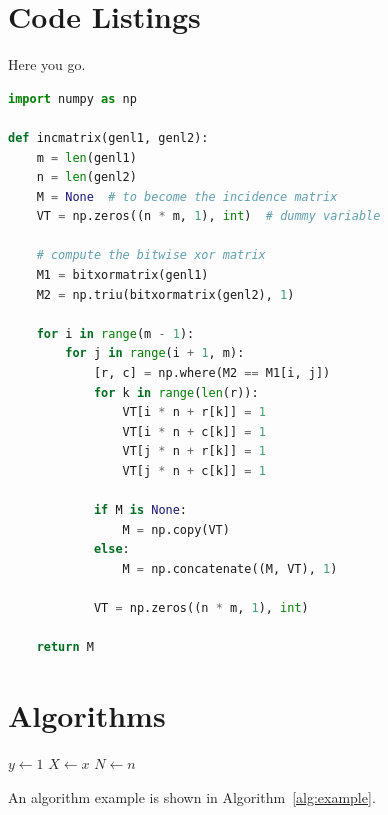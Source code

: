 \blindtext

\section{Code Listings}

Here you go.

\begin{lstlisting}[language=Python,caption={My Listing Caption},captionpos=b]
import numpy as np

def incmatrix(genl1, genl2):
    m = len(genl1)
    n = len(genl2)
    M = None  # to become the incidence matrix
    VT = np.zeros((n * m, 1), int)  # dummy variable

    # compute the bitwise xor matrix
    M1 = bitxormatrix(genl1)
    M2 = np.triu(bitxormatrix(genl2), 1)

    for i in range(m - 1):
        for j in range(i + 1, m):
            [r, c] = np.where(M2 == M1[i, j])
            for k in range(len(r)):
                VT[i * n + r[k]] = 1
                VT[i * n + c[k]] = 1
                VT[j * n + r[k]] = 1
                VT[j * n + c[k]] = 1

            if M is None:
                M = np.copy(VT)
            else:
                M = np.concatenate((M, VT), 1)

            VT = np.zeros((n * m, 1), int)

    return M
\end{lstlisting}

\blindtext

\section{Algorithms}

{}

\begin{algorithm}[hbt!]
  \caption{An algorithm with caption}\label{alg:example}
  $y \gets 1$\;
  $X \gets x$\;
  $N \gets n$\;
\end{algorithm}

An algorithm example is shown in Algorithm~\ref{alg:example}.
\blindtext

